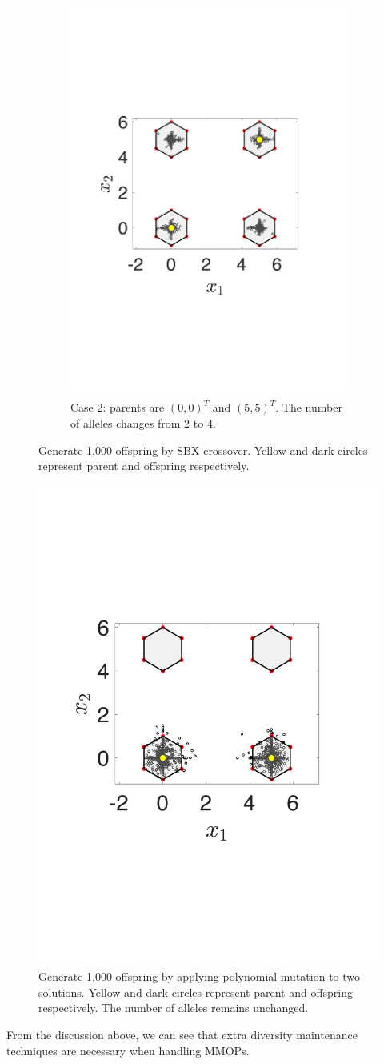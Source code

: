 \documentclass[conference]{IEEEtran}
\begin{document}
\begin{figure}[htbp]
\begin{subfigure}[b]{.24\textwidth}
		\includegraphics[width=\linewidth]{Section3/crossover2}
		\caption{Case 2: parents are $(0, 0)^T$ and $(5, 5)^T$. The number of alleles changes from 2 to 4.}
		\label{fig: SBX crossover case 2}
	\end{subfigure}
	\caption{Generate 1,000 offspring by SBX crossover. Yellow and dark circles represent parent and offspring respectively.}
	\label{fig: SBX crossover}
\end{figure}

\begin{figure}[htbp]
    \centering
    \includegraphics[width=.24\textwidth]{Section3/mutation}
    \caption{Generate 1,000 offspring by applying polynomial mutation to two solutions. Yellow and dark circles represent parent and offspring respectively. The number of alleles remains unchanged.}
    \label{fig: Polynomial mutation}
\end{figure}
From the discussion above, we can see that extra diversity maintenance techniques are necessary when handling MMOPs.
\end{document}
